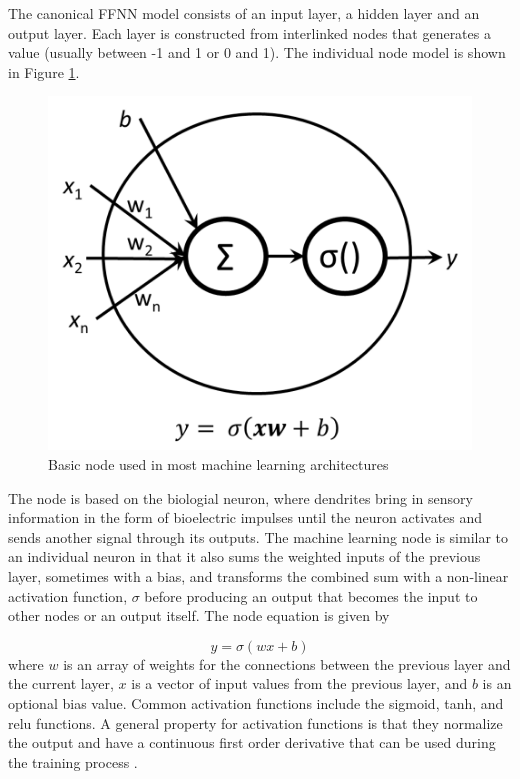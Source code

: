 \documentclass[twoside,twocolumn]{article}
\begin{document}
The canonical FFNN model consists of an input layer, a hidden layer and an output layer. Each layer is constructed from interlinked nodes that generates a value (usually between -1 and 1 or 0 and 1). The individual node model is shown in Figure \ref{fig:node}. \\
%
%
\begin{figure}[!h]
\centering
\includegraphics[width=.7\columnwidth]{images/node.png}  %
\caption{Basic node used in most machine learning architectures }
\label{fig:node}
\end{figure}
%
The node is based on the biologial neuron, where dendrites bring in sensory information in the form of bioelectric impulses until the neuron activates and sends another signal through its outputs. The machine learning node is similar to an individual neuron in that it also sums the weighted inputs of the previous layer, sometimes with a bias, and transforms the combined sum with a non-linear activation function, $\sigma$ before producing an output that becomes the input to other nodes or an output itself. The node  equation is given by

\begin{equation}
\label{eq:perceptron}
y= \sigma(wx+b)
\end{equation}
\noindent
where $w$ is an array of weights for the connections between the previous layer and the current layer, $x$ is a vector of input values from the previous layer, and $b$ is an optional bias value. Common activation functions include the sigmoid, tanh, and relu functions. A general property for activation functions is that they normalize the output and have a continuous first order derivative that can be used during the training process \citep{Goodfellow2016}. 
\end{document}
